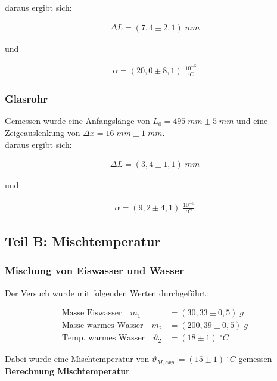 \documentclass[a4paper]{scrartcl}
\numberwithin{equation}{subsection}
\begin{document}
daraus ergibt sich:

\begin{align*}
\Delta L = (7,4\pm2,1)\;mm
\end{align*}

und

\begin{align*}
\alpha = (20,0\pm8,1)\;\frac{10^{-5}}{ ^\circ C}
\end{align*}

\subsubsection{Glasrohr}

Gemessen wurde eine Anfangslänge von $L_0 = 495 \;mm \pm 5 \;mm $ und eine Zeigeauslenkung von $\Delta x = 16 \;mm \pm 1 \;mm$.\\

daraus ergibt sich:

\begin{align*}
\Delta L = (3,4\pm1,1)\;mm
\end{align*}

und

\begin{align*}
\alpha = (9,2\pm4,1)\;\frac{10^{-5}}{ ^\circ C}
\end{align*}


\subsection{Teil B: Mischtemperatur}

\subsubsection{Mischung von Eiswasser und Wasser}
Der Versuch wurde mit folgenden Werten durchgeführt:

\begin{align*}
\text{Masse Eiswasser} \quad m_1 &= (30,33\pm0,5)\;g \\
\text{Masse warmes Wasser} \quad m_2 &= (200,39\pm0,5)\;g \\
\text{Temp. warmes Wasser} \quad \vartheta_2 &= (18\pm1)\; ^\circ C
\end{align*}

Dabei wurde eine Mischtemperatur von $\vartheta_{M, \textit{exp.}} = (15\pm1)\; ^\circ C$ gemessen \\

\textbf{Berechnung Mischtemperatur}
\end{document}
